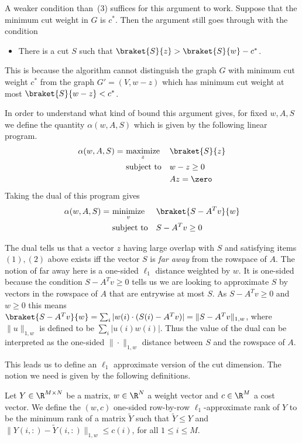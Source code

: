 A weaker condition than~(3) suffices for this argument to work.  Suppose that the minimum cut weight in $G$ is $c^*$.
Then the argument still goes through with the condition
\begin{itemize}
  \item[3'.] There is a cut $S$ such that $\braket{S}{z} > \braket{S}{w}-c^*$.
\end{itemize}
This is because the algorithm cannot distinguish the graph $G$ with minimum cut weight $c^*$ from the graph $G' = (V,w-z)$
which has minimum cut weight at most $\braket{S}{w-z} < c^*$.

In order to understand what kind of bound this argument gives, for fixed $w,A,S$ we define the quantity $\alpha(w,A,S)$
which is given by the following linear program.
\begin{equation*}
\begin{aligned}
\alpha(w,A,S) =\  & \underset{z}{\text{maximize}}
& & \braket{S}{z} \\
& \text{subject to}
& & w-z \ge 0 \\
& & & Az = \zero
\end{aligned}
\end{equation*}
Taking the dual of this program gives
\begin{equation*}
\begin{aligned}
\alpha(w,A,S) =\  & \underset{v}{\text{minimize}}
& & \braket{S - A^Tv}{w} \\
& \text{subject to}
& & S - A^T v \ge 0
\end{aligned}
\end{equation*}

The dual tells us that a vector $z$ having large overlap with $S$ and satisfying items $(1),(2)$ above exists
iff the vector $S$ is \emph{far away} from the rowspace of $A$.  The notion of far away here is a one-sided $\ell_1$ distance
weighted by $w$.  It is one-sided because the condition $S - A^T v \ge 0$ tells us we are looking to approximate $S$ by
vectors in the rowspace of $A$ that are entrywise at most $S$.  As $S - A^T v \ge 0$ and $w \ge 0$ this means
$\braket{S - A^Tv}{w} = \sum_i | w(i) \cdot (S (i)- A^Tv)| = \|S - A^Tv \|_{1,w}$, where
$\|u\|_{1,w}$ is defined to be $\sum_i |u(i)w(i)|$.  Thus the value of the dual can be interpreted as the one-sided $\| \cdot \|_{1,w}$ distance
between $S$ and the rowspace of $A$.

This leads us to define an $\ell_1$ approximate version of the cut dimension.  The notion
we need is given by the following definitions.
%
\begin{definition}
Let $Y \in \R^{M \times N}$ be a matrix, $w \in \R^N$ a weight vector and
$c \in \R^M$ a cost vector.  We define the $(w,c)$ one-sided row-by-row $\ell_1$-approximate rank of $Y$ to be
the minimum rank of a matrix $\tilde Y$ such that $\tilde Y \le Y$ and $\| Y(i,:) - \tilde Y(i,:) \|_{1,w} \le c(i)$,
for all $1 \leq i \leq M$.
\end{definition}

